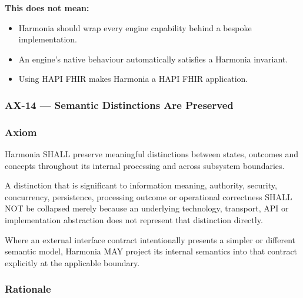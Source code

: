 \textbf{This does not mean:}

\label{rad:axioms:241}

\begin{itemize}

\item
Harmonia should wrap every engine capability behind a bespoke implementation.



\item
An engine's native behaviour automatically satisfies a Harmonia invariant.



\item
Using HAPI FHIR makes Harmonia a HAPI FHIR application.



\end{itemize}
\label{rad:axioms:245}



\label{rad:axioms:668}
\subsubsection*{AX-14 — Semantic Distinctions Are Preserved}
\label{rad:axioms:669}
\subsubsection*{Axiom}
\label{rad:axioms:670}

Harmonia SHALL preserve meaningful distinctions between states, outcomes and concepts throughout its internal processing and across subsystem boundaries.

\label{rad:axioms:672}

A distinction that is significant to information meaning, authority, security, concurrency, persistence, processing outcome or operational correctness SHALL NOT be collapsed merely because an underlying technology, transport, API or implementation abstraction does not represent that distinction directly.

\label{rad:axioms:674}

Where an external interface contract intentionally presents a simpler or different semantic model, Harmonia MAY project its internal semantics into that contract explicitly at the applicable boundary.

\label{rad:axioms:676}
\subsubsection*{Rationale}
\label{rad:axioms:677}

